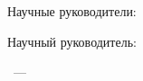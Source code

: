 %
\vspace{0pt plus4fill} %
\begin{flushright}
\ifdefined\supervisorTwoFio
Научные руководители:

\supervisorRegalia

\ifdefined\supervisorDead
\framebox{\supervisorFio}
\else
\supervisorFio
\fi

\supervisorTwoRegalia

\ifdefined\supervisorTwoDead
\framebox{\supervisorTwoFio}
\else
\supervisorTwoFio
\fi
\else
Научный руководитель:

\supervisorRegalia

\ifdefined\supervisorDead
\framebox{\supervisorFio}
\else
\supervisorFio
\fi
\fi

\end{flushright}
%
\vspace{0pt plus4fill} %
{\centering\thesisCity\ --- \thesisYear\par}
